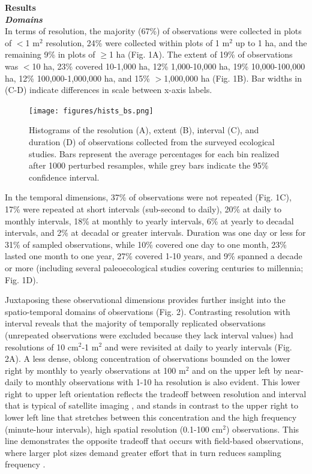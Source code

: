 \documentclass[12pt]{article}
\begin{document}
\noindent \textbf{Results}\\
\noindent \textbf{\emph{Domains}}\\
In terms of resolution, the majority (67\%) of observations were collected in plots of $<$1 m$^2$ resolution, 24\% were collected within plots of 1 m$^2$ up to 1 ha, and the remaining 9\% in plots of $\geq$1 ha (Fig. 1A). The extent of 19\% of observations was $<$10 ha, 23\% covered 10-1,000 ha, 12\% 1,000-10,000 ha, 19\% 10,000-100,000 ha, 12\% 100,000-1,000,000 ha, and 15\% $>$1,000,000 ha (Fig. 1B). Bar widths in (C-D) indicate differences in scale between x-axis labels.


\begin{figure}[!ht]
\texttt{[image: figures/hists\_bs.png]}
\vspace{-0.15 cm}
\caption{Histograms of the resolution (A), extent (B), interval (C), and duration (D) of observations collected from the surveyed ecological studies. Bars represent the average percentages for each bin realized after 1000 perturbed resamples, while grey bars indicate the 95\% confidence interval. }
\label{afoto1}
\end{figure}

In the temporal dimensions, 37\% of observations were not repeated (Fig. 1C), 17\% were repeated at short intervals (sub-second to daily), 20\% at daily to monthly intervals, 18\% at monthly to yearly intervals, 6\% at yearly to decadal intervals, and 2\% at decadal or greater intervals. Duration was one day or less for 31\% of sampled observations, while 10\% covered one day to one month, 23\% lasted one month to one year, 27\% covered 1-10 years, and 9\% spanned a decade or more (including several paleoecological studies covering centuries to millennia; Fig. 1D).

Juxtaposing these observational dimensions provides further insight into the spatio-temporal domains of observations (Fig. 2). Contrasting resolution with interval reveals that the majority of temporally replicated observations (unrepeated observations were excluded because they lack interval values) had resolutions of 10 cm$^2$-1 m$^2$ and were revisited at daily to yearly intervals (Fig. 2A). A less dense, oblong concentration of observations bounded on the lower right by monthly to yearly observations at 100 m$^2$ and on the upper left by near-daily to monthly observations with 1-10 ha resolution is also evident. This lower right to upper left orientation reflects the tradeoff between resolution and interval that is typical of satellite imaging \cite{estes_platform_2016}, and stands in contrast to the upper right to lower left line that stretches between this concentration and the high frequency (minute-hour intervals), high spatial resolution (0.1-100 cm$^2$) observations. This line demonstrates the opposite tradeoff that occurs with field-based observations, where larger plot sizes demand greater effort that in turn reduces sampling frequency \cite{kareiva_spatial_1988}.   
\end{document}
